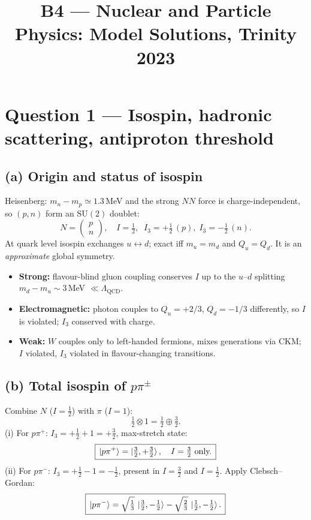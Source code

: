 \documentclass[11pt]{article}
\title{B4 --- Nuclear and Particle Physics: Model Solutions, Trinity 2023}
\author{}
\date{}
\begin{document}
\maketitle

\section*{Question 1 --- Isospin, hadronic scattering, antiproton threshold}

\subsection*{(a) Origin and status of isospin}

Heisenberg: $m_n-m_p\simeq 1.3$\,MeV and the strong $NN$ force is charge-independent, so $(p,n)$ form an $\mathrm{SU(2)}$ doublet:
\[
N=\begin{pmatrix}p\\ n\end{pmatrix},\quad I=\tfrac12,\;\; I_3=+\tfrac12\,(p),\; I_3=-\tfrac12\,(n).
\]
At quark level isospin exchanges $u\leftrightarrow d$; exact iff $m_u=m_d$ and $Q_u=Q_d$. It is an \emph{approximate} global symmetry.
\begin{itemize}
\item \textbf{Strong:} flavour-blind gluon coupling conserves $I$ up to the $u$--$d$ splitting $m_d-m_u\sim 3$\,MeV $\ll \Lambda_\mathrm{QCD}$.
\item \textbf{Electromagnetic:} photon couples to $Q_u=+2/3$, $Q_d=-1/3$ differently, so $I$ is violated; $I_3$ conserved with charge.
\item \textbf{Weak:} $W$ couples only to left-handed fermions, mixes generations via CKM; $I$ violated, $I_3$ violated in flavour-changing transitions.
\end{itemize}

\subsection*{(b) Total isospin of $p\pi^{\pm}$}

Combine $N$ ($I=\tfrac12$) with $\pi$ ($I=1$):
\[
\tfrac12\otimes 1 = \tfrac12\oplus\tfrac32.
\]
(i) For $p\pi^+$: $I_3=+\tfrac12+1=+\tfrac32$, max-stretch state:
\[
\boxed{\,\ket{p\pi^+}=\ket{\tfrac32,+\tfrac32},\quad I=\tfrac32\text{ only.}\,}
\]
(ii) For $p\pi^-$: $I_3=+\tfrac12-1=-\tfrac12$, present in $I=\tfrac32$ and $I=\tfrac12$. Apply Clebsch--Gordan:
\[
\boxed{\,\ket{p\pi^-}=\sqrt{\tfrac13}\,\ket{\tfrac32,-\tfrac12}-\sqrt{\tfrac23}\,\ket{\tfrac12,-\tfrac12}.\,}
\]
\end{document}
